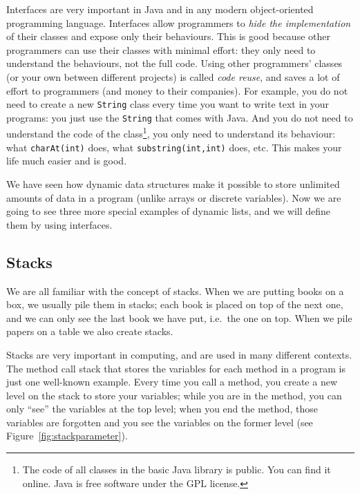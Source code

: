 Interfaces are very important in Java and in any modern
object-oriented programming language. Interfaces allow programmers to
\emph{hide the implementation} of their classes and expose only their
behaviours. This is good because other programmers can use their
classes with minimal effort: they only need to understand the
behaviours, not the full code. Using other programmers' classes (or
your own between different projects) is called \emph{code reuse}, and
saves a lot of effort to programmers (and money to their
companies). For example, you do not need to 
create a new \verb+String+ class every
time you want to write text in your programs: you just use the
\verb+String+ that comes with Java. And you do not need to understand
the code of the class\footnote{The code of all classes in the basic
  Java library is public. You can find it online. Java is free
  software under the GPL license.}, you only need to understand its
behaviour: what \verb+charAt(int)+ does, what
\verb+substring(int,int)+ does, etc. This makes your life much easier
and is good. 

We have seen how dynamic data structures make it possible to store
unlimited amounts of data in a program (unlike arrays or discrete
variables). Now we are going to see three more special examples of
dynamic lists, and we will define them by using interfaces. 

\subsection{Stacks}
\label{sec:stacks}

We are all familiar with the concept of stacks. When we are putting
books on a box, we usually pile them in stacks; each book is placed 
on top of the
next one, and we can only see the last book we have put, i.e.~the one
on top. When we pile papers on a table we also create stacks. 

Stacks are very important in computing, and are used in many different
contexts. The method call stack that stores the variables for each
method in a program is just one well-known example. Every time you
call a method, you create a new level on the stack to store your
variables; while you are in the method, you can only ``see'' the
variables at the top level; when you end the method, those variables are
forgotten and you see the variables on the former level (see
Figure~\ref{fig:stackparameter}).  

